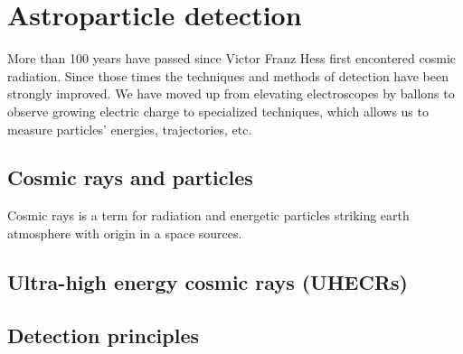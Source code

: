 
\chapter{Astroparticle detection}
More than 100 years have passed since Victor Franz Hess first encontered cosmic radiation. Since those times the techniques and methods of detection have been strongly improved. We have moved up from elevating electroscopes by ballons to observe growing electric charge to specialized techniques, which allows us to measure particles' energies, trajectories, etc.

\section{Cosmic rays and particles}
Cosmic rays is a term for radiation and energetic particles striking earth atmosphere with origin in a space sources. 
\section{Ultra-high energy cosmic rays (UHECRs)}
\section{Detection principles}

